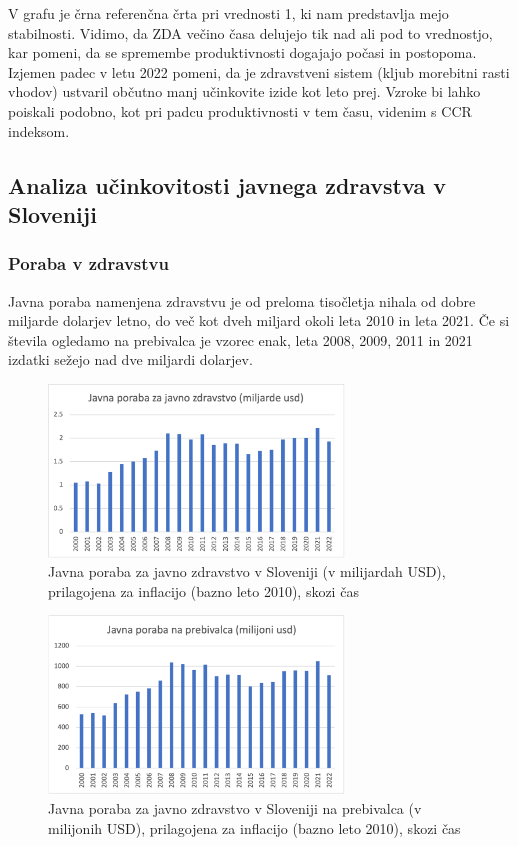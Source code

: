\documentclass[12pt,a4paper]{article}
\theoremstyle{definition}
\begin{document}
V grafu je črna referenčna črta pri vrednosti 1, ki nam predstavlja mejo stabilnosti. 
Vidimo, da ZDA večino časa delujejo tik nad ali pod to vrednostjo, kar pomeni, 
da se spremembe produktivnosti dogajajo počasi in postopoma. 
Izjemen padec v letu 2022 pomeni, da je zdravstveni sistem (kljub morebitni rasti vhodov) 
ustvaril občutno manj učinkovite izide kot leto prej. Vzroke bi lahko
poiskali podobno, kot pri padcu produktivnosti v tem času, videnim s CCR
indeksom.

\subsection{Analiza učinkovitosti javnega zdravstva v Sloveniji}
\subsubsection{Poraba v zdravstvu}

Javna poraba namenjena zdravstvu je od preloma tisočletja nihala od dobre miljarde dolarjev letno, do več kot dveh miljard okoli leta 2010 in leta 2021. 
Če si števila ogledamo na prebivalca je vzorec enak, leta 2008, 2009, 2011 in 2021 izdatki sežejo nad dve miljardi dolarjev.
\begin{figure}[H]   %
    \centering       %
    \includegraphics[width=0.7\textwidth]{jav_por_zdr_slo.png} %
    \caption{Javna poraba za javno zdravstvo v Sloveniji (v milijardah USD), prilagojena za inflacijo (bazno leto 2010), skozi čas}   %
    \label{fig:jav_por_zdr_slo} %
  \end{figure}

\begin{figure}[H]
    \centering
    \includegraphics[width=0.7\textwidth]{jav_por_prb_slo.png}
    \caption{Javna poraba za javno zdravstvo v Sloveniji na prebivalca (v milijonih USD), prilagojena za inflacijo (bazno leto 2010), skozi čas}
    \label{fig:jav_por_prb_slo.png}
  \end{figure}
\end{document}
